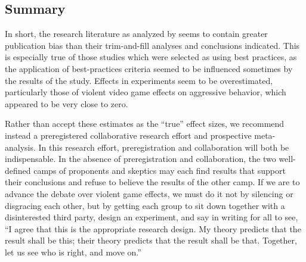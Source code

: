 \documentclass[man]{apa6}
\begin{document}
\subsection{Summary}
In short, the research literature as analyzed by \citet{Anderson:etal:2010} seems to contain greater publication bias than their trim-and-fill analyses and conclusions indicated. This is especially true of those studies which were selected as using best practices, as the application of best-practices criteria seemed to be influenced sometimes by the results of the study. Effects in experiments seem to be overestimated, particularly those of violent video game effects on aggressive behavior, which appeared to be very close to zero. 

Rather than accept these estimates as the ``true'' effect sizes, we recommend instead a preregistered collaborative research effort and prospective meta-analysis. In this research effort, preregistration and collaboration will both be indispensable. In the absence of preregistration and collaboration, the two well-defined camps of proponents and skeptics may each find results that support their conclusions and refuse to believe the results of the other camp. If we are to advance the debate over violent game effects, we must do it not by silencing or disgracing each other, but by getting each group to sit down together with a disinterested third party, design an experiment, and say in writing for all to see, ``I agree that this is the appropriate research design. My theory predicts that the result shall be this; their theory predicts that the result shall be that. Together, let us see who is right, and move on.''


\end{document}

